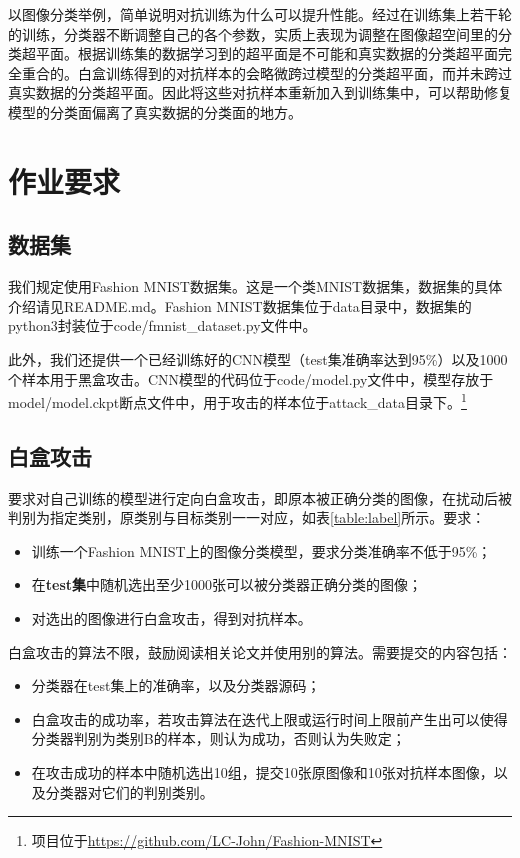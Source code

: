 \documentclass[journal, a4paper]{IEEEtran}
\begin{document}
以图像分类举例，简单说明对抗训练为什么可以提升性能。经过在训练集上若干轮的训练，分类器不断调整自己的各个参数，实质上表现为调整在图像超空间里的分类超平面。根据训练集的数据学习到的超平面是不可能和真实数据的分类超平面完全重合的。白盒训练得到的对抗样本的会略微跨过模型的分类超平面，而并未跨过真实数据的分类超平面。因此将这些对抗样本重新加入到训练集中，可以帮助修复模型的分类面偏离了真实数据的分类面的地方。

\section{作业要求}
\label{section:requirement}

\subsection{数据集}
\label{section:requirement;subsection:dataset}

我们规定使用Fashion MNIST数据集。这是一个类MNIST数据集，数据集的具体介绍请见README.md。Fashion MNIST数据集位于data目录中，数据集的python3封装位于code/fmnist\_dataset.py文件中。

此外，我们还提供一个已经训练好的CNN模型（test集准确率达到95\%）以及1000个样本用于黑盒攻击。CNN模型的代码位于code/model.py文件中，模型存放于model/model.ckpt断点文件中，用于攻击的样本位于attack\_data目录下。\footnote{项目位于\url{https://github.com/LC-John/Fashion-MNIST}}

\subsection{白盒攻击}
\label{section:requirement;subsection:white-box attack}

要求对自己训练的模型进行定向白盒攻击，即原本被正确分类的图像，在扰动后被判别为指定类别，原类别与目标类别一一对应，如表\ref{table:label}所示。要求：

\begin{itemize}
    \item 训练一个Fashion MNIST上的图像分类模型，要求分类准确率不低于95\%；
    \item 在\textbf{test集}中随机选出至少1000张可以被分类器正确分类的图像；
    \item 对选出的图像进行白盒攻击，得到对抗样本。
\end{itemize}

白盒攻击的算法不限，鼓励阅读相关论文并使用别的算法。需要提交的内容包括：

\begin{itemize}
    \item 分类器在test集上的准确率，以及分类器源码；
    \item 白盒攻击的成功率，若攻击算法在迭代上限或运行时间上限前产生出可以使得分类器判别为类别B的样本，则认为成功，否则认为失败定；
    \item 在攻击成功的样本中随机选出10组，提交10张原图像和10张对抗样本图像，以及分类器对它们的判别类别。
\end{itemize}
\end{document}
